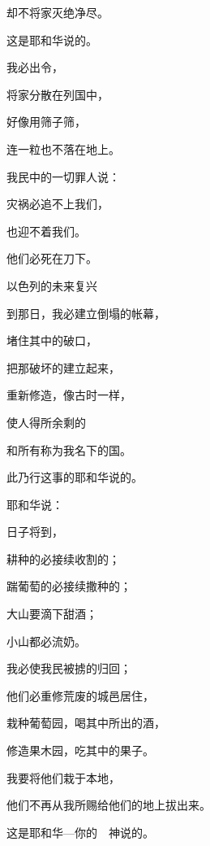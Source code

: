 {\par }{\Q 却不将{}家灭绝净尽。
\par }{\Q 这是耶和华说的。
\par }{\BB \par }{\Q {}我必出令，
\par }{\Q 将{}家分散在列国中，
\par }{\Q 好像用筛子筛{}，
\par }{\Q 连一粒也不落在地上。
\par }{\Q {}我民中的一切罪人说：
\par }{\Q 灾祸必追不上我们，
\par }{\Q 也迎不着我们。
\par }{\Q 他们必死在刀下。
\par }{\SH 以色列的未来复兴
\par }{\Q {}到那日，我必建立{}倒塌的帐幕，
\par }{\Q 堵住其中的破口，
\par }{\Q 把那破坏的建立起来，
\par }{\Q 重新修造，像古时一样，
\par }{\Q {}使{}人得{}所余剩的
\par }{\Q 和所有称为我名下的国。
\par }{\Q 此乃行这事的耶和华说的。
\par }{\BB \par }{\Q {}耶和华说：
\par }{\Q 日子将到，
\par }{\Q 耕种的必接续收割的；
\par }{\Q 踹葡萄的必接续撒种的；
\par }{\Q 大山要滴下甜酒；
\par }{\Q 小山都必流奶。
\par }{\Q {}我必使我民{}被掳的归回；
\par }{\Q 他们必重修荒废的城邑居住，
\par }{\Q 栽种葡萄园，喝其中所出的酒，
\par }{\Q 修造果木园，吃其中的果子。
\par }{\Q {}我要将他们栽于本地，
\par }{\Q 他们不再从我所赐给他们的地上拔出来。
\par }{\Q 这是耶和华—你的　神说的。
\par }